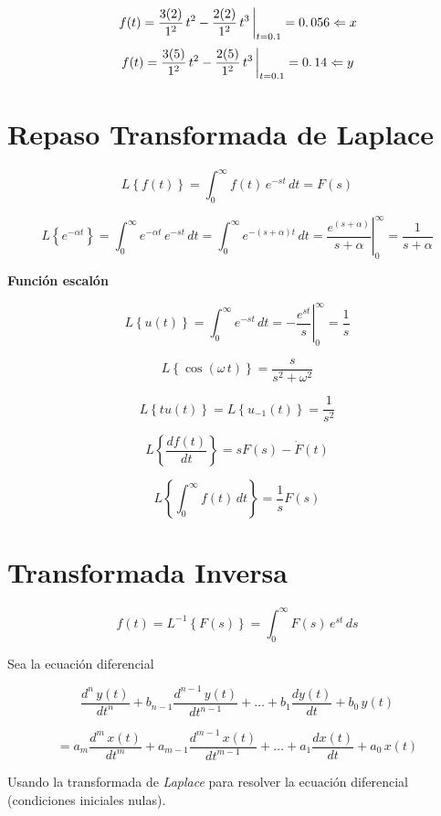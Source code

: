 $$\left. f(t) = \dfrac{3(2)}{1^2}\, t^2 - \dfrac{2(2)}{1^2}\, t^3\, \right|_{t = 0\ldotp1} = 0\ldotp056 \Leftarrow x$$
$$\left. f(t) = \dfrac{3(5)}{1^2}\, t^2 - \dfrac{2(5)}{1^2}\, t^3\, \right|_{t = 0\ldotp1} = 0\ldotp14 \Leftarrow y$$



\section{Repaso Transformada de Laplace}

$$L\left\lbrace f(t) \right\rbrace = \displaystyle \int_{0}^{\infty} f(t)\,e^{-st}\, dt = F(s)$$

$$\left. L\left\lbrace e^{-\alpha t} \right\rbrace = \displaystyle \int_{0}^{\infty} e^{-\alpha t}\,e^{-st}\, dt = \displaystyle \int_{0}^{\infty} e^{-(s + \alpha)t}\, dt = \dfrac{e^{(s + \alpha)}}{s + \alpha}\right|_{0}^{\infty} = \dfrac{1}{s + \alpha}$$

\textbf{Función escalón}

$$\left. L\left\lbrace u(t) \right\rbrace = \displaystyle \int_{0}^{\infty} e^{-st}\, dt = - \dfrac{e^{st}}{s} \right|_{0}^{\infty} = \dfrac{1}{s}$$

$$ L\left\lbrace \cos (\omega\, t) \right\rbrace = \dfrac{s}{s^2 + \omega^2}$$

$$ L\left\lbrace tu(t) \right\rbrace = L\left\lbrace u_{-1}(t) \right\rbrace = \dfrac{1}{s^2}$$

$$ L\left\lbrace \dfrac{df(t)}{dt} \right\rbrace = sF(s) - \dot{F}(t)$$

$$ L\left\lbrace \displaystyle \int_{0}^{\infty} f(t)\, dt \right\rbrace = \dfrac{1}{s} F(s)$$




\section{Transformada Inversa}

$$f(t) = L^{-1} \left\lbrace F(s) \right\rbrace = \displaystyle \int_{0}^{\infty} F(s)\, e^{st}\, ds$$

Sea la ecuación diferencial

$$\dfrac{d^n\, y(t)}{dt^{n}} + b_{n -1} \dfrac{d^{n - 1}\, y(t)}{dt^{n - 1}} + \ldots + b_{1} \dfrac{dy(t)}{dt} + b_{0}\,y(t)$$

$$= a_{m}\dfrac{d^m\, x(t)}{dt^{m}} + a_{m -1} \dfrac{d^{m - 1}\, x(t)}{dt^{m - 1}} + \ldots + a_{1} \dfrac{dx(t)}{dt} + a_{0}\,x(t)$$

Usando la transformada de \textit{Laplace} para resolver la ecuación diferencial 
(condiciones iniciales nulas).


